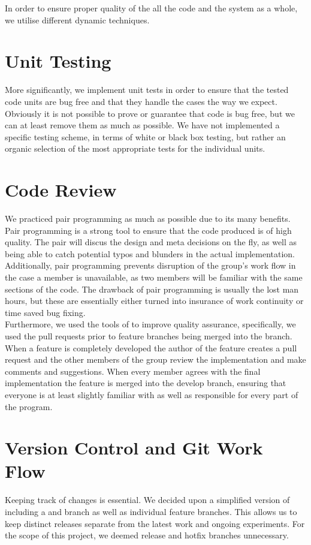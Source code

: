 In order to ensure proper quality of the all the code and the system as a whole, we utilise different dynamic techniques.

\section{Unit Testing}
More significantly, we implement unit tests in order to ensure that the tested code units are bug free and that they handle the cases the way we expect. Obviously it is not possible to prove or guarantee that code is bug free, but we can at least remove them as much as possible. We have not implemented a specific testing scheme, in terms of white or black box testing, but rather an organic selection of the most appropriate tests for the individual units.

\section{Code Review}
We practiced pair programming as much as possible due to its many benefits. \\
Pair programming is a strong tool to ensure that the code produced is of high quality. The pair will discus the design and meta decisions on the fly, as well as being able to catch potential typos and blunders in the actual implementation. Additionally, pair programming prevents disruption of the group's work flow in the case a member is unavailable, as two members will be familiar with the same sections of the code. The drawback of pair programming is usually the lost man hours, but these are essentially either turned into insurance of work continuity or time saved bug fixing. \\
Furthermore, we used the tools of  to improve quality assurance, specifically, we used the pull requests prior to feature branches being merged into the  branch. When a feature is completely developed the author of the feature creates a pull request and the other members of the group review the implementation and make comments and suggestions. When every member agrees with the final implementation the feature is merged into the develop branch, ensuring that everyone is at least slightly familiar with as well as responsible for every part of the program.

\section{Version Control and Git Work Flow}
Keeping track of changes is essential. We decided upon a simplified version of  including a  and  branch as well as individual feature branches. This allows us to keep distinct releases separate from the latest work and ongoing experiments. For the scope of this project, we deemed release and hotfix branches unnecessary.
